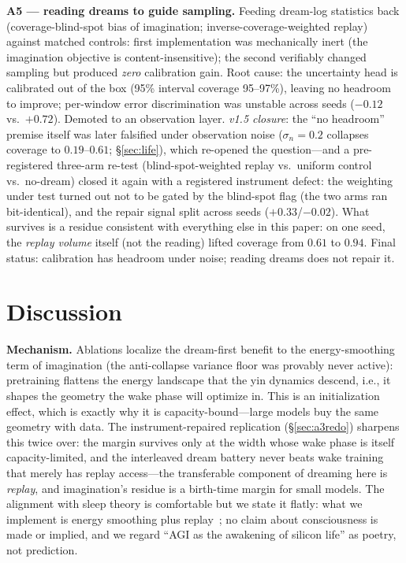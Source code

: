 \documentclass[11pt,a4paper]{article}
\begin{document}
\textbf{A5 --- reading dreams to guide sampling.} Feeding dream-log statistics back (coverage-blind-spot bias of imagination; inverse-coverage-weighted replay) against matched controls: first implementation was mechanically inert (the imagination objective is content-insensitive); the second verifiably changed sampling but produced \emph{zero} calibration gain. Root cause: the uncertainty head is calibrated out of the box (95\% interval coverage 95--97\%), leaving no headroom to improve; per-window error discrimination was unstable across seeds ($-0.12$ vs.\ $+0.72$). Demoted to an observation layer. \emph{v1.5 closure}: the ``no headroom'' premise itself was later falsified under observation noise ($\sigma_n{=}0.2$ collapses coverage to $0.19$--$0.61$; \S\ref{sec:life}), which re-opened the question---and a pre-registered three-arm re-test (blind-spot-weighted replay vs.\ uniform control vs.\ no-dream) closed it again with a registered instrument defect: the weighting under test turned out not to be gated by the blind-spot flag (the two arms ran bit-identical), and the repair signal split across seeds ($+0.33$/$-0.02$). What survives is a residue consistent with everything else in this paper: on one seed, the \emph{replay volume} itself (not the reading) lifted coverage from $0.61$ to $0.94$. Final status: calibration has headroom under noise; reading dreams does not repair it.

\section{Discussion}\label{sec:disc}

\textbf{Mechanism.} Ablations localize the dream-first benefit to the energy-smoothing term of imagination (the anti-collapse variance floor was provably never active): pretraining flattens the energy landscape that the yin dynamics descend, i.e., it shapes the geometry the wake phase will optimize in. This is an initialization effect, which is exactly why it is capacity-bound---large models buy the same geometry with data. The instrument-repaired replication (\S\ref{sec:a3redo}) sharpens this twice over: the margin survives only at the width whose wake phase is itself capacity-limited, and the interleaved dream battery never beats wake training that merely has replay access---the transferable component of dreaming here is \emph{replay}, and imagination's residue is a birth-time margin for small models. The alignment with sleep theory is comfortable but we state it flatly: what we implement is energy smoothing plus replay~\cite{tononi2014,crick1983,shin2017}; no claim about consciousness is made or implied, and we regard ``AGI as the awakening of silicon life'' as poetry, not prediction.
\end{document}
